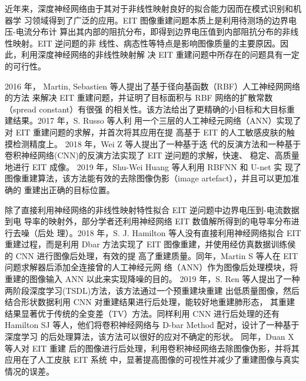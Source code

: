 
近年来，深度神经网络由于其对于非线性映射良好的拟合能力因而在模式识别和机器学
习领域得到了广泛的应用。EIT 图像重建问题本质上是利用待测场的边界电压-电流分布计
算出其内部的阻抗分布，即得到边界电压值到内部阻抗分布的非线性映射。EIT 逆问题的非
线性、病态性等特点是影响图像质量的主要原因。因此，利用深度神经网络的非线性映射解
决 EIT 重建问题中所存在的问题具有一定的可行性。

2016 年， Martin, Sebastien 等人提出了基于径向基函数（RBF）人工神经网网络的方法
来解决 EIT 重建问题，并证明了目标面积与 RBF 网络的扩散常数（spread constant）有很强
的相关性。该方法给出了更精确的小目标和大目标重建结果\cite{Ontheinf}。2017 年，S. Russo 等人利
用一个三层的人工神经元网络（ANN）实现了对 EIT 重建问题的求解，并首次将其应用在提
高基于 EIT 的人工敏感皮肤的触摸检测精度上。\cite{8233910} 2018 年，Wei Z 等人提出了一种基于迭
代的反演方法和一种基于卷积神经网络(CNN)的反演方法实现了 EIT 逆问题的求解，快速、
稳定、高质量地进行 EIT 成像。\cite{8606211} 2019 年，Shu-Wei Huang 等人利用 RBFNN 和 U-net 实
现了图像重建算法，该方法能有效的去除图像伪影（image artefact），并且可以更加准确的
重建出正确的目标位置\cite{8856781}。

除了直接利用神经网络的非线性映射特性拟合 EIT 逆问题中边界电压到-电流数据到电
导率的映射外，部分学者还利用神经网络 EIT 数值解所得到的电导率分布进行去噪（后处
理）。2018 年，S. J. Hamilton 等人没有直接利用神经网络拟合 EIT 重建过程，而是利用 Dbar 方法实现了 EIT 图像重建，并使用经仿真数据训练侯的 CNN 进行图像后处理，有效的提
高了重建质量\cite{8352045}。同年，Martin S 等人在 EIT 问题求解器后添加全连接曾的人工神经元网
络（ANN）作为图像后处理模块，将重建的图像输入 ANN 以此来实现降噪的目的\cite{S2017A}。
2019 年，S. Ren 等人提出了一种两阶段深度学习(TSDL)方法，该方法通过一个预重建块重建
出低质量图像，然后结合形状数据利用 CNN 对重建结果进行后处理，能较好地重建肺形态，
其重建结果显著优于传统的全变差（TV）方法\cite{8907811}。同样利用 CNN 进行后处理的还有
Hamilton SJ 等人，他们将卷积神经网络与 D-bar Method 配对，设计了一种基于深度学习
的后处理算法，该方法可以很好的应对不确定的形状\cite{2019Beltrami}。 同年，Duan X 等人对 EIT 重建
后的图像进行后处理，利用卷积神经网络去除图像伪影，并将其应用在了人工皮肤 EIT 系统
中，显著提高图像的可视性并减少了重建图像与真实情况的误差\cite{2019Artificial}。

